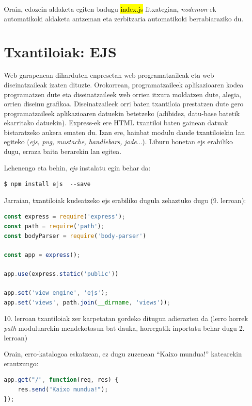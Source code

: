 Orain, edozein aldaketa egiten badugu \hl{index.js} fitxategian, \textit{nodemon}-ek automatikoki aldaketa antzeman eta zerbitzaria automatikoki berrabiaraziko du. 

\section{Txantiloiak: EJS}
Web garapenean diharduten enpresetan web programatzaileak eta web diseinatzaileak izaten dituzte. Orokorrean, programatzaileek aplikazioaren kodea programatzen dute eta diseinatzaileek web orrien itxura moldatzen dute, alegia, orrien diseinu grafikoa. Diseinatzaileek orri baten txantiloia prestatzen dute gero programatzaileek aplikazioaren datuekin betetzeko (adibidez, datu-base batetik ekarritako datuekin). Express-ek ere HTML txantiloi baten gainean datuak bistaratzeko aukera ematen du. Izan ere, hainbat modulu daude txantiloiekin lan egiteko (\textit{ejs, pug, mustache, handlebars, jade}...). Liburu honetan ejs erabiliko dugu, erraza baita berarekin lan egitea.

Lehenengo eta behin, \textit{ejs} instalatu egin behar da:

\begin{lstlisting}
$ npm install ejs  --save
\end{lstlisting}

Jarraian, txantiloiak kudeatzeko ejs erabiliko dugula zehaztuko dugu (9. lerroan):

\begin{lstlisting}[language=JavaScript]
const express = require('express');
const path = require('path');
const bodyParser = require('body-parser')

const app = express();

app.use(express.static('public'))

app.set('view engine', 'ejs');
app.set('views', path.join(__dirname, 'views'));
\end{lstlisting}

10. lerroan txantiloiak zer karpetatan gordeko ditugun adierazten da (lerro horrek \textit{path} moduluarekin mendekotasun bat dauka, horregatik inportatu behar dugu 2. lerroan)

Orain, erro-katalogoa eskatzean, ez dugu zuzenean ``Kaixo mundua!'' katearekin erantzungo:

\begin{lstlisting}[language=JavaScript]
app.get("/", function(req, res) {
    res.send("Kaixo mundua!");
});
\end{lstlisting}

